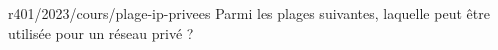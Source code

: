 \begin{question}{r401/2023/cours/plage-ip-privees}
  Parmi les plages suivantes, laquelle peut être utilisée pour un
  réseau privé ?
  \begin{reponseshoriz}
  \end{reponseshoriz}
\end{question}
